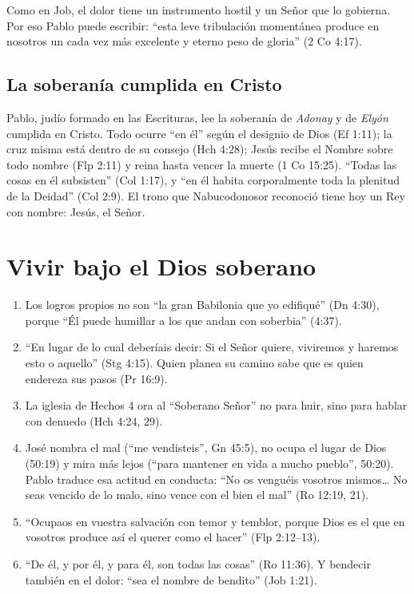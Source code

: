 Como en Job, el dolor tiene un instrumento hostil y un Señor que lo gobierna. Por eso Pablo puede escribir: ``esta leve tribulación momentánea produce en nosotros un cada vez más excelente y eterno peso de gloria'' (2 Co 4:17).

\subsection{La soberanía cumplida en Cristo}
Pablo, judío formado en las Escrituras, lee la soberanía de \emph{Adonay} y de \emph{Elyón} cumplida en Cristo. Todo ocurre ``en él'' según el designio de Dios (Ef 1:11); la cruz misma está dentro de su consejo (Hch 4:28); Jesús recibe el Nombre sobre todo nombre (Flp 2:11) y reina hasta vencer la muerte (1 Co 15:25). ``Todas las cosas en él subsisten'' (Col 1:17), y ``en él habita corporalmente toda la plenitud de la Deidad'' (Col 2:9). El trono que Nabucodonosor reconoció tiene hoy un Rey con nombre: Jesús, el Señor.

\section{Vivir bajo el Dios soberano}

\begin{enumerate}
\item {} Los logros propios no son ``la gran Babilonia que yo edifiqué'' (Dn 4:30), porque ``Él puede humillar a los que andan con soberbia'' (4:37).
\item {} ``En lugar de lo cual deberíais decir: Si el Señor quiere, viviremos y haremos esto o aquello'' (Stg 4:15). Quien planea su camino sabe que es \SENOR{} quien endereza sus pasos (Pr 16:9).
\item {} La iglesia de Hechos 4 ora al ``Soberano Señor'' no para huir, sino para hablar con denuedo (Hch 4:24, 29).
\item {} José nombra el mal (``me vendisteis'', Gn 45:5), no ocupa el lugar de Dios (50:19) y mira más lejos (``para mantener en vida a mucho pueblo'', 50:20). Pablo traduce esa actitud en conducta: ``No os venguéis vosotros mismos\ldots{} No seas vencido de lo malo, sino vence con el bien el mal'' (Ro 12:19, 21).
\item {} ``Ocupaos en vuestra salvación con temor y temblor, porque Dios es el que en vosotros produce así el querer como el hacer'' (Flp 2:12--13).
\item {} ``De él, y por él, y para él, son todas las cosas'' (Ro 11:36). Y bendecir también en el dolor: ``sea el nombre de \SENOR{} bendito'' (Job 1:21).
\end{enumerate}

